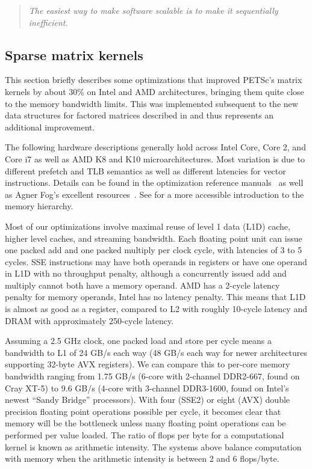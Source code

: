 \begin{quote}
  \emph{The easiest way to make software scalable is to make it sequentially inefficient.}~\cite{gropp1999exploiting}
\end{quote}

\subsection{Sparse matrix kernels}\label{ssec:sparsekernels}

This section briefly describes some optimizations that improved PETSc's matrix kernels by about 30\% on Intel and AMD architectures, bringing them quite close to the memory bandwidth limits.
This was implemented subsequent to the new data structures for factored matrices described in \cite{smith2010sparse} and thus represents an additional improvement.

The following hardware descriptions generally hold across Intel Core, Core 2, and Core i7 as well as AMD K8 and K10 microarchitectures.
Most variation is due to different prefetch and TLB semantics as well as different latencies for vector instructions.
Details can be found in the optimization reference manuals~\cite{intel2011optimization,amd2009optimization} as well as Agner Fog's excellent resources~\cite{fog2011michoarchitecture,fog2011instruction}.
See \cite{drepper2007memory} for a more accessible introduction to the memory hierarchy.

Most of our optimizations involve maximal reuse of level 1 data (L1D) cache, higher level caches, and streaming bandwidth.
Each floating point unit can issue one packed add and one packed multiply per clock cycle, with latencies of 3 to 5 cycles.
SSE instructions may have both operands in registers or have one operand in L1D with no throughput penalty, although a concurrently issued add and multiply cannot both have a memory operand.
AMD has a 2-cycle latency penalty for memory operands, Intel has no latency penalty.
This means that L1D is almost as good as a register, compared to L2 with roughly 10-cycle latency and DRAM with approximately 250-cycle latency.

Assuming a 2.5 GHz clock, one packed load and store per cycle means a bandwidth to L1 of 24 GB/s each way (48 GB/s each way for newer architectures supporting 32-byte AVX registers).
We can compare this to per-core memory bandwidth ranging from 1.75 GB/s (6-core with 2-channel DDR2-667, found on Cray XT-5) to 9.6 GB/s (4-core with 3-channel DDR3-1600, found on Intel's newest ``Sandy Bridge'' processors).
With four (SSE2) or eight (AVX) double precision floating point operations possible per cycle, it becomes clear that memory will be the bottleneck unless many floating point operations can be performed per value loaded.
The ratio of flops per byte for a computational kernel is known as arithmetic intensity.
The systems above balance computation with memory when the arithmetic intensity is between 2 and 6 flops/byte.


